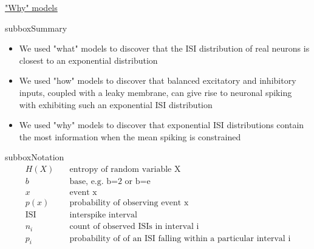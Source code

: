 \begin{textbox}{\href{https://compneuro.neuromatch.io/tutorials/W1D1_ModelTypes/student/W1D1_Tutorial3.html}{"Why" models } }
\begin{subbox}{subbox}{Summary}
\begin{itemize}
\item We used "what" models to discover that the ISI distribution of real neurons is closest to an exponential distribution
\item We used "how" models to discover that balanced excitatory and inhibitory inputs, coupled with a leaky membrane, can give rise to neuronal spiking with exhibiting such an exponential ISI distribution
 \item We used "why" models to discover that exponential ISI distributions contain the most information when the mean spiking is constrained
\end{itemize}
\end{subbox}

\begin{subbox}{subbox}{Notation}
\tiny
\begin{align*}
H(X) &\quad \text{entropy of random variable X}\\
b &\quad \text{base, e.g. b=2 or b=e}\\
x &\quad \text{event x}\\
p(x) &\quad \text{probability of observing event x}\\
\text{ISI} &\quad \text{interspike interval}\\
n_i &\quad \text{count of observed ISIs in interval i}\\
p_i  &\quad \text{probability of of an ISI falling within a particular interval i}
\end{align*}
\end{subbox}
\end{textbox}
